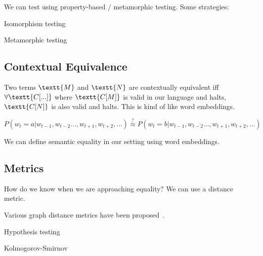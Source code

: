 \documentclass[11pt]{article}
\begin{document}
    We can test using property-based / metamorphic testing. Some strategies:

    Isomorphism testing

    Metamorphic testing

    \subsection{Contextual Equivalence}


    Two terms $\textt{M}$ and $\textt{N}$ are contextually equivalent iff $\forall \textt{C[...]}$ where $\textt{C[M]}$ is valid in our language and halts, $\textt{C[N]}$ is also valid and halts. This is kind of like word embeddings.

    $P(w_t = a | w_{t-1}, w_{t-2}\ldots, w_{t+1}, w_{t+2}, \ldots)\overset{?}{\approx} P(w_t = b | w_{t-1}, w_{t-2}\ldots, w_{t+1}, w_{t+2}, \ldots)$

    We can define semantic equality in our setting using word embeddings.

%
%

    \subsection{Metrics}\label{sec:probabilistic}

    How do we know when we are approaching equality? We can use a distance metric.


    Various graph distance metrics have been proposed~\citet{sanfeliu1983distance}.

    Hypothesis testing

    Kolmogorov-Smirnov
\end{document}
